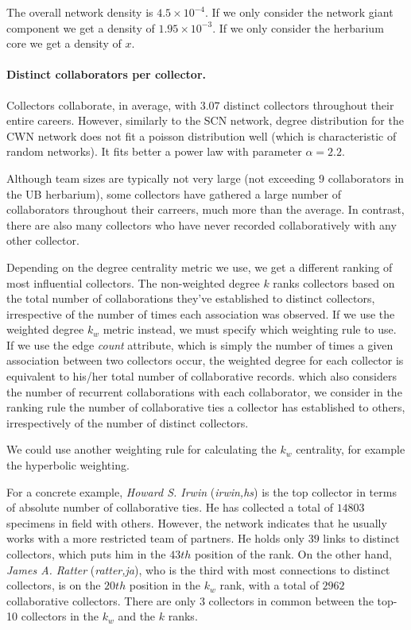 The overall network density is $4.5 \times 10^{-4}$.
If we only consider the network giant component we get a density of $1.95 \times 10^{-3}$.
If we only consider the herbarium core we get a density of $x$.

\paragraph*{Distinct collaborators per collector.}
Collectors collaborate, in average, with $3.07$ distinct collectors throughout their entire careers.
However, similarly to the SCN network, degree distribution for the CWN network does not fit a poisson distribution well (which is characteristic of random networks). It fits better a power law with parameter $\alpha=2.2$.

Although team sizes are typically not very large (not exceeding 9 collaborators in the UB herbarium), some collectors have gathered a large number of collaborators throughout their carreers, much more than the average. %
In contrast, there are also many collectors who have never recorded collaboratively with any other collector.

Depending on the degree centrality metric we use, we get a different ranking of most influential collectors.
The non-weighted degree $k$ ranks collectors based on the total number of collaborations they've established to distinct collectors, irrespective of the number of times each association was observed.
If we use the weighted degree $k_w$ metric instead, we must specify which weighting rule to use. If we use the edge \textit{count} attribute, which is simply the number of times a given association between two collectors occur, the weighted degree for each collector is equivalent to his/her total number of collaborative records. which also considers the number of recurrent collaborations with each collaborator, we consider in the ranking rule the number of collaborative ties a collector has established to others, irrespectively of the number of distinct collectors.

We could use another weighting rule for calculating the $k_w$ centrality, for example the hyperbolic weighting.


For a concrete example, \textit{Howard S. Irwin} (\textit{irwin,hs}) is the top collector in terms of absolute number of collaborative ties. He has collected a total of $14803$ specimens in field with others. However, the network indicates that he usually works with a more restricted team of partners. He holds only $39$ links to distinct collectors, which puts him in the $43th$ position of the rank. 
On the other hand, \textit{James A. Ratter} (\textit{ratter,ja}), who is the third with most connections to distinct collectors, is on the $20th$ position in the $k_w$ rank, with a total of $2962$ collaborative collectors.
There are only $3$ collectors in common between the top-10 collectors in the $k_w$ and the $k$ ranks.

